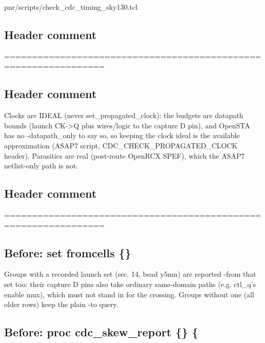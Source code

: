 \begin{relocated}{pnr/scripts/check_cdc_timing_sky130.tcl}

\subsection*{Header comment}

\begin{textblock}
================================================================
\end{textblock}

\subsection*{Header comment}

\begin{textblock}

Clocks are IDEAL (never set_propagated_clock): the budgets are datapath bounds (launch CK->Q
plus wires/logic to the capture D pin), and OpenSTA has no -datapath_only to say so, so
keeping the clock ideal is the available approximation (ASAP7 script, CDC_CHECK_PROPAGATED_CLOCK
header). Parasitics are real (post-route OpenRCX SPEF), which the ASAP7 netlist-only path is not.

\end{textblock}

\subsection*{Header comment}

\begin{textblock}
================================================================
\end{textblock}

\subsection*{Before: set fromcells \{\}}

\begin{textblock}
Groups with a recorded launch set (sec. 14, bead y5mn) are reported -from that set too: their capture
D pins also take ordinary same-domain paths (e.g. ctl_q's enable mux), which must not stand in for the
crossing. Groups without one (all older rows) keep the plain -to query.
\end{textblock}

\subsection*{Before: proc cdc\_skew\_report \{\} \{}


\end{relocated}
